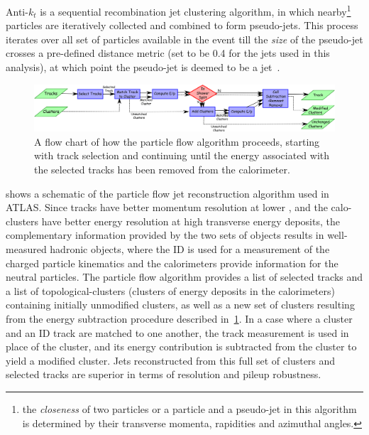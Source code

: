 Anti-$k_t$ is a sequential recombination jet clustering algorithm, in which nearby\footnote{the \textit{closeness} of two particles or a particle and a pseudo-jet in this algorithm is determined by their transverse momenta, rapidities and azimuthal angles.} particles are iteratively collected and combined to form pseudo-jets. This process iterates over all set of particles available in the event till the \textit{size} of the pseudo-jet crosses a pre-defined distance metric (set to be 0.4 for the jets used in this analysis), at which point the pseudo-jet is deemed to be a jet~\cite{anti-kT}.

\begin{figure}[!ht]
    \centering
    \includegraphics[width=\linewidth]{figures//experiment/pflowJets.png}
    \caption{A flow chart of how the particle flow algorithm proceeds, starting with track selection and continuing until the energy associated with the selected tracks has been removed from the calorimeter.~\cite{PERF-2015-09}}
    \label{fig:pflow}
\end{figure}

 shows a schematic of the particle flow jet reconstruction algorithm used in ATLAS. Since tracks have better momentum resolution at lower \pT, and the calo-clusters have better energy resolution at high transverse energy deposits, the complementary information provided by the two sets of objects results in well-measured hadronic objects, where the ID is used for a measurement of the charged particle kinematics and the calorimeters provide information for the neutral particles. The particle flow algorithm provides a list of selected tracks and a list of topological-clusters (clusters of energy deposits in the calorimeters) containing initially unmodified clusters, as well as a new set of clusters resulting from the energy subtraction procedure described in~\cref{fig:pflow}. In a case where a cluster and an ID track are matched to one another, the track measurement is used in place of the cluster, and its energy contribution is subtracted from the cluster to yield a modified cluster. Jets reconstructed from this full set of clusters and selected tracks are superior in terms of resolution and pileup robustness.